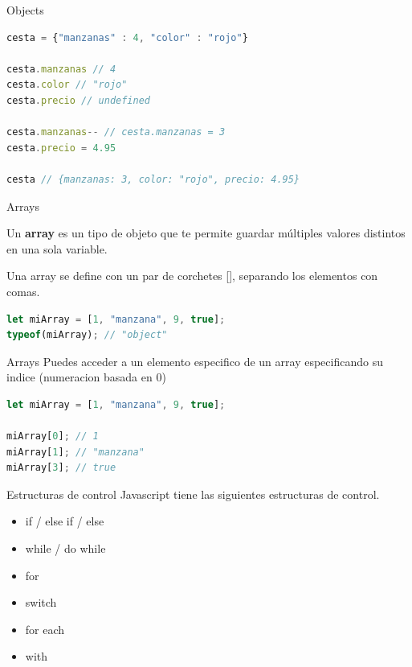 \documentclass{beamer}
\begin{document}
\begin{frame}[fragile]{Objects}
\begin{lstlisting}[language=JavaScript]
cesta = {"manzanas" : 4, "color" : "rojo"}

cesta.manzanas // 4
cesta.color // "rojo"
cesta.precio // undefined

cesta.manzanas-- // cesta.manzanas = 3
cesta.precio = 4.95

cesta // {manzanas: 3, color: "rojo", precio: 4.95}
\end{lstlisting}
\end{frame}

\begin{frame}[fragile]{Arrays}

Un \textbf{array} es un tipo de objeto que te permite guardar múltiples valores distintos en una sola variable.

Una array se define con un par de corchetes [], separando los elementos con comas.

\begin{lstlisting}[language=JavaScript]
let miArray = [1, "manzana", 9, true];
typeof(miArray); // "object"
\end{lstlisting}


\end{frame}

\begin{frame}[fragile]{Arrays}
Puedes acceder a un elemento especifico de un array especificando su indice (numeracion basada en 0)

\begin{lstlisting}[language=JavaScript]
let miArray = [1, "manzana", 9, true];

miArray[0]; // 1
miArray[1]; // "manzana"
miArray[3]; // true
\end{lstlisting} 
\end{frame}


\begin{frame}{Estructuras de control}
Javascript tiene las siguientes estructuras de control.
\begin{itemize}
    \item if / else if / else
    \item while / do while
    \item for
    \item switch
    \item for each
    \item with
\end{itemize}
\end{frame}
\end{document}
